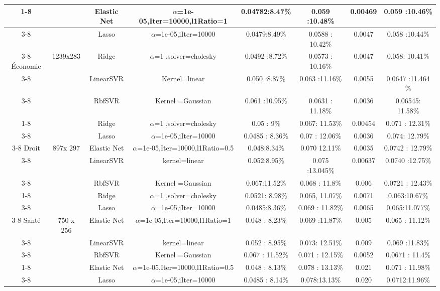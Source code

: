 \begin{table}
{{\begin{tabular}{|c|c|c|c|c|c|c|c|}
		\cline{1-8}
		\hline
		\multirow{5}{*}{}
		&&Elastic Net&${\alpha}$=1e-05,Iter=10000,l1Ratio=1&0.04782:8.47\%&0.059 :10.48\%&0.00469&0.059 :10.46\% \\
		\cline{3-8}
		&&Lasso&${\alpha}$=1e-05,iIter=10000&0.0479:8.49\%&0.0588 : 10.42\%& 0.0047&0.058 :10.44\% \\
		\cline{3-8}
		Économie&{1239x283}&Ridge&${\alpha}$=1 ,solver=cholesky&0.0492 :8.72\% &0.0573 : 10.16\%& 0.0047&0.058: 10.41\% \\
		\cline{3-8}
		&&LinearSVR&Kernel=linear&0.050 :8.87\%&0.063 :11.16\%&0.0055& 0.0647 :11.464 \%\\
		\cline{3-8}
		&&RbfSVR&Kernel =Gaussian&0.061 :10.95\%&0.0631 : 11.18\%&0.0036& 0.06545: 11.58\%\\
		\cline{1-8}
		\hline
		\multirow{5}{*}{}
		&&Ridge&${\alpha}$=1 ,solver=cholesky&0.05 : 9\% &0.067: 11.53\%& 0.00454&0.071 : 12.31\% \\
		\cline{3-8}
		&&Lasso&${\alpha}$=1e-05,iIter=10000&0.0485 : 8.36\%&0.07 : 12.06\%&0.0036&  0.074: 12.79\%\\
		\cline{3-8}
		Droit&897x 297&Elastic Net&${\alpha}$=1e-05,Iter=10000,l1Ratio=0.5&0.048:8.34\%&0.070
		12.11\%
		&0.0035& 0.0742 : 12.79\%\\
		\cline{3-8}
		&&LinearSVR&kernel=linear&0.052:8.95\%&0.075 :13.045\%&0.00637&0.0740 :12.75\%\\
		\cline{3-8}
		&&RbfSVR&Kernel =Gaussian&0.067:11.52\%&0.068 : 11.8\% &0.006& 0.0721 : 12.43\%\\
		\cline{1-8}
		\hline
		\multirow{5}{*}{}
		&&Ridge&${\alpha}$=1 ,solver=cholesky&0.0521: 8.98\% &0.065, 11.07\% & 0.0071&0.063:10.67\% \\
		\cline{3-8}
		&&Lasso&${\alpha}$=1e-05,iIter=10000&0.0485:8.36\%&0.069 : 11.82\%&0.0065& 0.065:11.077\%\\
		\cline{3-8}
		Santé&750 x 256&Elastic Net&${\alpha}$=1e-05,Iter=10000,l1Ratio=1&0.048 : 8.23\%&0.069 :11.87\% &0.005&0.065 : 11.12\% \\
		\cline{3-8}
		&&LinearSVR&kernel=linear&0.052 : 8.95\%&0.073: 12.51\%& 0.009&0.069 :11.83\% \\
		\cline{3-8}
		&&RbfSVR&Kernel =Gaussian&0.067 : 11.52\%&0.071 : 12.15\%&0.0052&0.0671 : 11.4\% \\
		\cline{1-8}
		\hline
		\multirow{5}{*}{}
		&&Elastic Net&${\alpha}$=1e-05,Iter=10000,l1Ratio=0.5&0.048 : 8.13\%&0.078 : 13.13\%&0.021&0.071 : 11.98\% \\
		\cline{3-8}
		&&Lasso&${\alpha}$=1e-05,iIter=10000&0.0485 :  8.14\%&0.078:13.13\%&0.020& 0.0712:11.96\%\\

\end{tabular}}}
\end{table}
